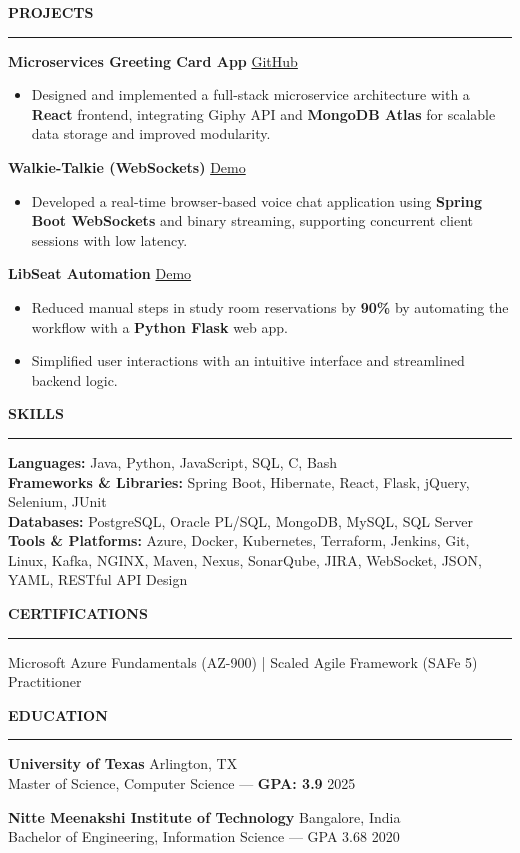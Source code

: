 \documentclass[10pt]{article}
\newcommand{\sectionTitle}[1]{\vspace{1pt}\noindent\textbf{\small #1}\vspace{0.5pt}\hrule\vspace{1pt}}
\begin{document}
\sectionTitle{PROJECTS}

\textbf{Microservices Greeting Card App} \hfill \href{https://github.com/SuhasBk/vcard-microservices}{GitHub}
\begin{itemize}
    \item Designed and implemented a full-stack microservice architecture with a \textbf{React} frontend, integrating Giphy API and \textbf{MongoDB Atlas} for scalable data storage and improved modularity.
\end{itemize}

\textbf{Walkie-Talkie (WebSockets)} \hfill \href{https://walkie-talkie.fly.dev}{Demo}
\begin{itemize}
    \item Developed a real-time browser-based voice chat application using \textbf{Spring Boot WebSockets} and binary streaming, supporting concurrent client sessions with low latency.
\end{itemize}

\textbf{LibSeat Automation} \hfill \href{https://libseat.fly.dev}{Demo}
\begin{itemize}
    \item Reduced manual steps in study room reservations by \textbf{90\%} by automating the workflow with a \textbf{Python Flask} web app.
    \item Simplified user interactions with an intuitive interface and streamlined backend logic.
\end{itemize} 

\sectionTitle{SKILLS}

\textbf{Languages:} Java, Python, JavaScript, SQL, C, Bash \\
\textbf{Frameworks \& Libraries:} Spring Boot, Hibernate, React, Flask, jQuery, Selenium, JUnit \\
\textbf{Databases:} PostgreSQL, Oracle PL/SQL, MongoDB, MySQL, SQL Server \\
\textbf{Tools \& Platforms:} Azure, Docker, Kubernetes, Terraform, Jenkins, Git, Linux, Kafka, NGINX, Maven, Nexus, SonarQube, JIRA, WebSocket, JSON, YAML, RESTful API Design

\sectionTitle{CERTIFICATIONS}

Microsoft Azure Fundamentals (AZ-900) \;|\; Scaled Agile Framework (SAFe 5) Practitioner

\sectionTitle{EDUCATION}

\textbf{University of Texas} \hfill Arlington, TX \\
Master of Science, Computer Science — \textbf{GPA: 3.9} \hfill 2025

\textbf{Nitte Meenakshi Institute of Technology} \hfill Bangalore, India \\
Bachelor of Engineering, Information Science — GPA 3.68 \hfill 2020
\end{document}
